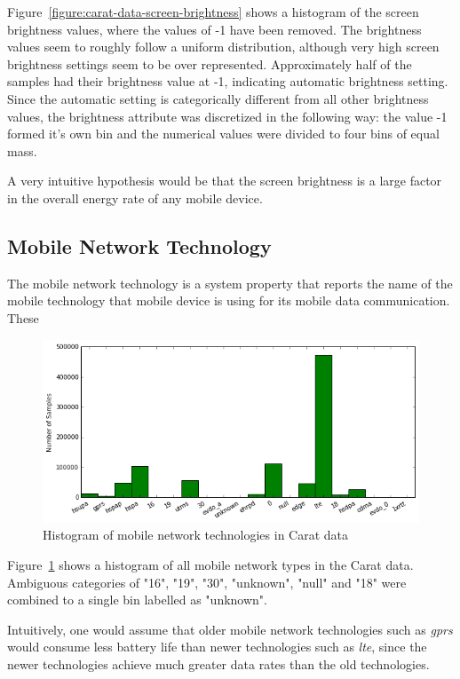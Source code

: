 Figure~\ref{figure:carat-data-screen-brightness} shows a histogram of the screen brightness values, where the values of -1 have been removed. The brightness values seem to roughly follow a uniform distribution, although very high screen brightness settings seem to be over represented. Approximately half of the samples had their brightness value at -1, indicating automatic brightness setting. Since the automatic setting is categorically different from all other brightness values, the brightness attribute was discretized in the following way: the value -1 formed it's own bin and the numerical values were divided to four bins of equal mass.   

A very intuitive hypothesis would be that the screen brightness is a large factor in the overall energy rate of any mobile device.

\subsection{Mobile Network Technology}  

The mobile network technology is a system property that reports the name of the mobile technology that mobile device is using for its mobile data communication. These 

\begin{figure}[!htbp]
	\centering
	\includegraphics[width=\textwidth]{images/carat-data/mobile_net_type.png}
	\caption{Histogram of mobile network technologies in Carat data}
	\label{figure:carat-data-mobile-net-type}
\end{figure}   

Figure~\ref{figure:carat-data-mobile-net-type} shows a histogram of all mobile network types in the Carat data. Ambiguous categories of "16", "19", "30", "unknown", "null" and "18" were combined to a single bin labelled as "unknown".

Intuitively, one would assume that older mobile network technologies such as \textit{gprs} would consume less battery life than newer technologies such as \textit{lte}, since the newer technologies achieve much greater data rates than the old technologies.

